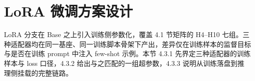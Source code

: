 \section{LoRA 微调方案设计}

LoRA 分支在 Base 之上引入训练侧参数化，覆盖 4.1 节矩阵的 H4--H10 七组。三种适配器均在同一基座、同一训练脚本骨架下产出，差异仅在训练样本的监督目标与是否在训练 prompt 中注入 few-shot 示例。本节 4.3.1 先界定三种适配器的训练样本与 loss 口径，4.3.2 给出与之匹配的一组超参数，4.3.3 说明从训练落盘到推理侧挂载的完整链路。




